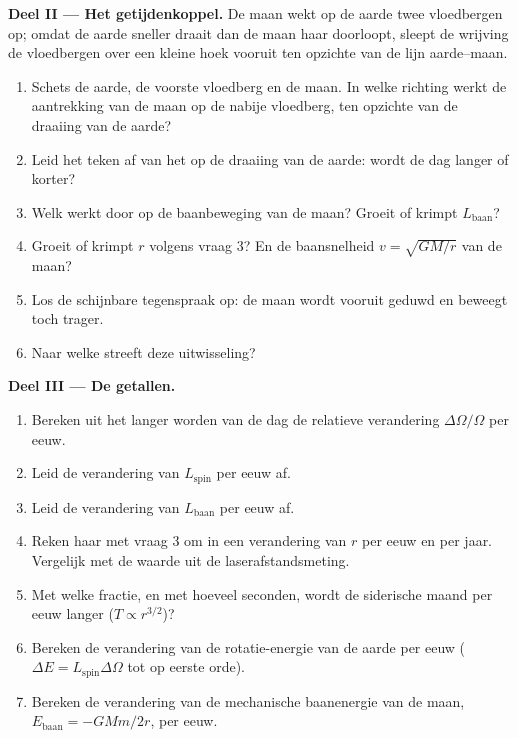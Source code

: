\begin{problem}
\medskip
\noindent\textbf{Deel II --- Het getijdenkoppel.}
De maan wekt op de aarde twee vloedbergen op; omdat de aarde
sneller draait dan de maan haar  doorloopt, sleept de wrijving de vloedbergen over een kleine hoek
vooruit ten opzichte van de lijn aarde--maan.
\begin{enumerate}[resume]
  \item Schets de aarde, de voorste vloedberg en de maan. In welke
        richting werkt de aantrekking van de maan op de nabije vloedberg,
        ten opzichte van de draaiing van de aarde?
  \item Leid het teken af van het  op de draaiing van de aarde: wordt de
        dag langer of korter?
  \item Welk  werkt door  op de baanbeweging van
        de maan? Groeit of krimpt $L_{\text{baan}}$?
  \item Groeit of krimpt $r$ volgens vraag 3? En de baansnelheid
        $v = \sqrt{GM/r}$ van de maan?
  \item Los de schijnbare tegenspraak op: de maan wordt vooruit geduwd en
        beweegt toch trager.
  \item Naar welke  streeft deze uitwisseling?
\end{enumerate}

\medskip
\noindent\textbf{Deel III --- De getallen.}
\begin{enumerate}[resume]
  \item Bereken uit het langer worden van de dag de relatieve verandering
        $\Delta\Omega/\Omega$ per eeuw.
  \item Leid de verandering van $L_{\text{spin}}$ per eeuw af.
  \item Leid de verandering van $L_{\text{baan}}$ per eeuw af.
  \item Reken haar met vraag 3 om in een verandering van $r$ per eeuw
        en per jaar. Vergelijk met de waarde uit de laserafstandsmeting.
  \item Met welke fractie, en met hoeveel seconden, wordt de siderische
        maand per eeuw langer ($T \propto r^{3/2}$)?
  \item Bereken de verandering van de rotatie-energie van de aarde
        per eeuw ($\Delta E = L_{\text{spin}}\Delta\Omega$ tot op eerste
        orde).
  \item Bereken de verandering van de mechanische baanenergie van de maan,
        $E_{\text{baan}} = -GMm/2r$, per eeuw.
\end{enumerate}


\end{problem}
